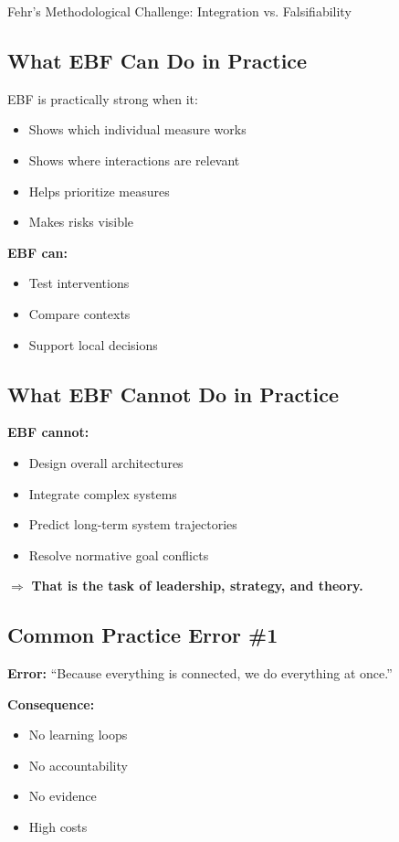 \begin{chapter}{Fehr's Methodological Challenge: Integration vs. Falsifiability}
\subsection{What EBF Can Do in Practice}

EBF is practically strong when it:
\begin{itemize}[noitemsep]
    \item Shows which individual measure works
    \item Shows where interactions are relevant
    \item Helps prioritize measures
    \item Makes risks visible
\end{itemize}

\textbf{EBF can:}
\begin{itemize}[noitemsep]
    \item Test interventions
    \item Compare contexts
    \item Support local decisions
\end{itemize}

\subsection{What EBF Cannot Do in Practice}

\textbf{EBF cannot:}
\begin{itemize}[noitemsep]
    \item Design overall architectures
    \item Integrate complex systems
    \item Predict long-term system trajectories
    \item Resolve normative goal conflicts
\end{itemize}

$\Rightarrow$ \textbf{That is the task of leadership, strategy, and theory.}

\subsection{Common Practice Error \#1}

\begin{tcolorbox}[colback=red!10!white,colframe=red!75!black]
\textbf{Error:} ``Because everything is connected, we do everything at once.''

\textbf{Consequence:}
\begin{itemize}[noitemsep]
    \item No learning loops
    \item No accountability
    \item No evidence
    \item High costs
\end{itemize}


\end{tcolorbox}
\end{chapter}
